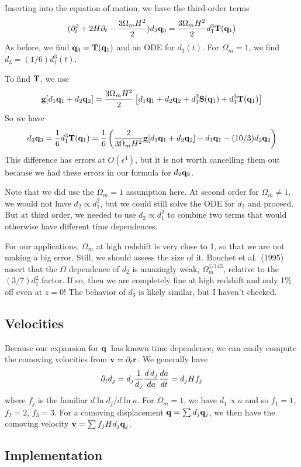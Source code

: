 \documentclass[11pt,preprint]{aastex}
\newcommand{\beq}{\begin{equation}}
\newcommand{\eeq}{\end{equation}}
\newcommand{\bfr}{\ensuremath{{\bf r}}}
\newcommand{\bfv}{\ensuremath{{\bf v}}}
\newcommand{\bfg}{\ensuremath{{\bf g}}}
\newcommand{\bfq}{\ensuremath{{\bf q}}}
\newcommand{\bfS}{\ensuremath{{\bf S}}}
\newcommand{\bfT}{\ensuremath{{\bf T}}}
\begin{document}
Inserting into the equation of motion, we have the third-order terms
\beq
(\partial_t^2 + 2H\partial_t - {3\Omega_m H^2\over 2}) d_3 \bfq_3 = 
	{3\Omega_m H^2\over 2} d_1^3 \bfT(\bfq_1)
\eeq
As before, we find $\bfq_3 = \bfT(\bfq_1)$ and an ODE for $d_3(t)$.
For $\Omega_m = 1$, we find $d_3 = (1/6) d_1^3(t)$.

To find $\bfT$, we use
\beq
\bfg[d_1 \bfq_1 + d_2 \bfq_2] = {3\Omega_m H^2\over 2}
	\left[ d_1 \bfq_1 + d_2 \bfq_2 + d_1^2 \bfS(\bfq_1) + d_1^3 \bfT(\bfq_1)
	\right]
\eeq
So we have
\beq
d_3 \bfq_3 = {1\over 6} d_1^3 \bfT(\bfq_1) = 
	{1\over 6} \left({2\over 3\Omega_m H^2} \bfg[d_1\bfq_1+ d_2\bfq_2]
		- d_1 \bfq_1 - (10/3) d_2 \bfq_2 \right)
\eeq
This difference has errors at $O(\epsilon^4)$, but it is not worth cancelling
them out because we had these errors in our formula for $d_2 \bfq_2$.

Note that we did use the $\Omega_m=1$ assumption here.  At second
order for $\Omega_m \ne 1$, we would not have $d_2 \propto d_1^2$,
but we could still solve the ODE for $d_2$ and proceed.  But at
third order, we needed to use $d_2\propto d_1^2$ to combine two
terms that would otherwise have different time dependences.

For our applications, $\Omega_m$ at high redshift is very close to 1, so
that we are not making a big error.  Still, we should assess the size of it.
Bouchet et al.\ (1995) assert that the $\Omega$ dependence of $d_2$ is amazingly
weak, $\Omega_m^{1/143}$, relative to the $(3/7) d_1^2$ factor.  If so, 
then we are completely fine at high redshift and only 1\% off even at
$z=0$!  The behavior of $d_3$ is likely similar, but I haven't checked.

\subsection{Velocities}

Because our expansion for \bfq\ has known time dependence, we can easily
compute the comoving velocities from $\bfv = \partial_t \bfr$.  We generally
have 
\beq
\partial_t d_j = d_j {1\over d_j}{d\,d_j\over da}{da\over dt} = d_j H f_j
\eeq
where $f_j$ is the familiar $d\ln d_j/d\ln a$.  For $\Omega_m=1$, we
have $d_1 \propto a$ and so $f_1 = 1$, $f_2 = 2$, $f_3 = 3$.
For a comoving displacement $\bfq = \sum d_j \bfq_j$, we then have the 
comoving velocity $\bfv = \sum f_j H d_j \bfq_j$.

\subsection{Implementation}
\end{document}
